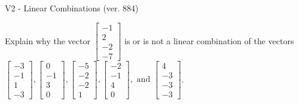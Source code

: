 \begin{exercise}
  \begin{exerciseTitle}V2 - Linear Combinations (ver. 884)\end{exerciseTitle}
  \begin{exerciseStatement}
    Explain why the vector \(\left[\begin{array}{c}
-1 \\
2 \\
-2 \\
-7
\end{array}\right]\)  is or is not a linear 
	combination of the vectors \(\left[\begin{array}{c}
-3 \\
-1 \\
1 \\
-3
\end{array}\right] , \left[\begin{array}{c}
0 \\
-1 \\
3 \\
0
\end{array}\right] , \left[\begin{array}{c}
-5 \\
-2 \\
-2 \\
1
\end{array}\right] , \left[\begin{array}{c}
-2 \\
-1 \\
4 \\
0
\end{array}\right] , \text{ and } \left[\begin{array}{c}
4 \\
-3 \\
-3 \\
-3
\end{array}\right]\).
	



\end{exerciseStatement}
\end{exercise}
